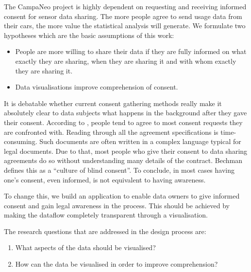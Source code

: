 \documentclass[../paper.tex]{subfiles}
\begin{document}
  The CampaNeo project is highly dependent on requesting and receiving informed
  consent for sensor data sharing. The more people agree to send usage data from
  their cars, the more value the statistical analysis will generate. We
  formulate two hypotheses which are the basic assumptions of this work:

  \begin{itemize}
    \item People are more willing to share their data if they are fully informed
          on what exactly they are sharing, when they are sharing it and with
          whom exactly they are sharing it.
    \item Data visualisations improve comprehension of consent.
  \end{itemize}

  It is debatable whether current consent gathering methods really make it
  absolutely clear to data subjects what happens in the background after they
  gave their consent. According to \cite{Borgesisus_informed_consent_2015}, people
  tend to agree to most consent requests they are confronted with.
  Reading through all the agreement specifications is time-consuming. Such
  documents are often written in a complex language typical for legal documents.
  Due to that, most people who give their consent to data sharing agreements do so
  without understanding many details of the contract. Bechman \cite{Bechmann2014}
  defines this as a “culture of blind consent”. To conclude, in most cases having
  one’s consent, even informed, is not equivalent to having awareness.

  To change this, we build an application to enable data owners to give informed
  consent and gain legal awareness in the process. This should be achieved by
  making the dataflow completely transparent through a visualisation.

  The research questions that are addressed in the design process are:

  \begin{enumerate}
    \item What aspects of the data should be visualised?
    \item How can the data be visualised in order to improve comprehension?
  \end{enumerate}
\end{document}
